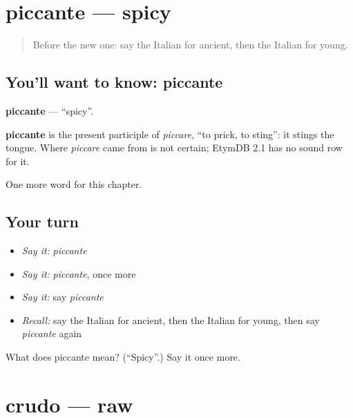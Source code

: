 \section[piccante]{piccante — spicy}

\label{lesson:IT-C246-piccante}



\begin{quote}
Before the new one: say the Italian for ancient, then the Italian for young.
\end{quote}

\subsection*{You'll want to know: piccante}
\textbf{piccante} — \textquotedblleft{}spicy\textquotedblright{}.

\begin{cousinweb}
\textbf{piccante} is the present participle of \emph{piccare}, \textquotedblleft{}to prick, to sting\textquotedblright{}: it stings the tongue. Where \emph{piccare} came from is not certain; EtymDB 2.1 has no sound row for it.
\end{cousinweb}

\begin{grammarlens}[title={What you've built}]
One more word for this chapter.
\end{grammarlens}

\subsection*{Your turn}
\begin{itemize}
\raggedright
  \item \emph{Say it:} \emph{piccante}
  \item \emph{Say it:} \emph{piccante}, once more
  \item \emph{Say it:} say \emph{piccante}
  \item \emph{Recall:} say the Italian for ancient, then the Italian for young, then say \emph{piccante} again
\end{itemize}

\begin{tcolorbox}[breakable,colback=teal!4,colframe=teal!35!black,title={Before you move on}]
What does piccante mean? (\textquotedblleft{}Spicy\textquotedblright{}.) Say it once more.
\end{tcolorbox}
\section[crudo]{crudo — raw}

